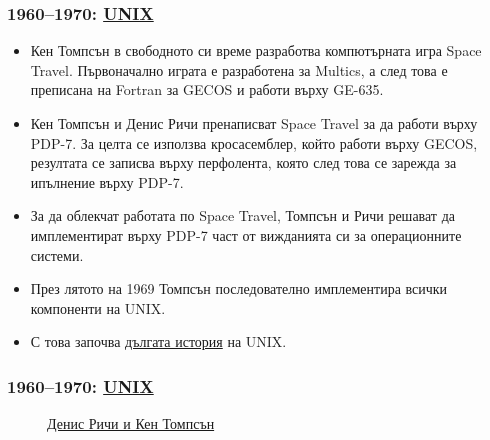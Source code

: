 \documentclass[ignorenonframetext, hyperref=unicode]{beamer}
\begin{document}
\begin{frame}
\frametitle{1960--1970: \href{http://en.wikipedia.org/wiki/Unix}{UNIX}}
\begin{itemize}
  \item Кен Томпсън в свободното си време разработва компютърната игра Space
  Travel. Първоначално играта е разработена за Multics, а след това е преписана
  на Fortran за GECOS и работи върху GE-635.
  \item Кен Томпсън и Денис Ричи пренаписват Space Travel за да работи върху
  PDP-7. За целта се използва кросасемблер, който работи върху GECOS, резултата
  се записва върху перфолента, която след това се зарежда за ипълнение върху
  PDP-7.
  \item За да облекчат работата по Space Travel, Томпсън и Ричи решават да
  имплементират върху PDP-7 част от вижданията си за операционните системи.
  \item През лятото на 1969 Томпсън последователно имплементира всички
  компоненти на UNIX.
  \item С това започва \href{http://www.levenez.com/unix}{дългата история} на
  UNIX. 
\end{itemize}
\end{frame}


\begin{frame}
\frametitle{1960--1970: \href{http://en.wikipedia.org/wiki/Unix}{UNIX}}
\begin{figure}
\center
{}
\caption{\href{http://www.bell-labs.com/history/unix/firstport.html}{Денис Ричи
и Кен Томпсън}} 
\end{figure}
\end{frame}
\end{document}
